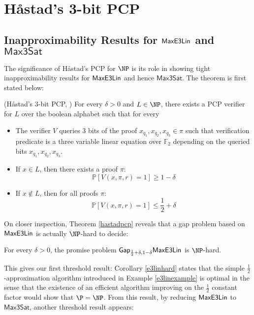 \section{H\aa stad's 3-bit PCP}
\subsection{Inapproximability Results for $\mathsf{MaxE3Lin}$ and $\mathsf{Max3Sat}$}
The significance of H\aa stad's PCP for $\NP$ is its role in showing tight inapproximability results for $\mathsf{MaxE3Lin}$ and hence $\mathsf{Max3Sat}$. The theorem is first stated below:

\begin{theorem} \label{hastadpcp} (H\aa stad's 3-bit PCP, \cite{haastad2001some})
For every $\delta > 0$ and $L \in \NP$, there exists a PCP verifier for $L$ over the boolean alphabet such that for every
\begin{itemize}
  \item The verifier $V$ queries 3 bits of the proof $x_{q_1},x_{q_2}, x_{q_3} \in \pi$ such that verification predicate is a three variable linear equation over $\mathbb{F}_2$ depending on the queried bits $x_{q_1},x_{q_2}, x_{q_3}$.
  \item If $x \in L$, then there exists a proof $\pi$:
        \begin{equation}
          \mathbb{P}[V(x,\pi, r) = 1] \geq 1 - \delta
        \end{equation}
  \item If $x \not\in L$, then for all proofs $\pi$:
        \begin{equation}
          \mathbb{P}[V(x,\pi,r) = 1] \leq \frac{1}{2} + \delta
        \end{equation}
\end{itemize}
\end{theorem}

On closer inspection, Theorem \ref{hastadpcp} reveals that a gap problem based on $\mathsf{MaxE3Lin}$ is actually $\NP$-hard to decide:

\begin{corollary} \label{e3linhard}
For every $\delta >0$, the promise problem $\mathsf{Gap}_{\frac{1}{2} + \delta, 1 - \delta}\mathsf{MaxE3Lin}$ is $\NP$-hard.
\end{corollary}

This gives our first threshold result: Corollary \ref{e3linhard} states that the simple $\frac{1}{2}$-approximation algorithm introduced in Example \ref{e3linexample} is optimal in the sense that the existence of an efficient algorithm improving on the $\frac{1}{2}$ constant factor would show that $\P = \NP$. From this result, by reducing $\mathsf{MaxE3Lin}$ to $\mathsf{Max3Sat}$, another threshold result appears:

